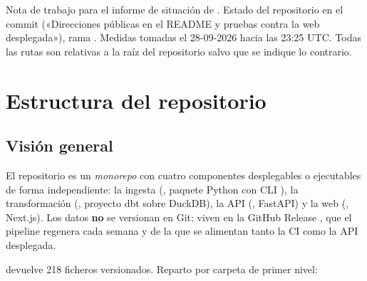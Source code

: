 \begin{nota}
Nota de trabajo para el informe de situación de . Estado del repositorio en el commit  («Direcciones públicas en el README y pruebas contra la web desplegada»), rama . Medidas tomadas el 28-09-2026 hacia las 23:25 UTC. Todas las rutas son relativas a la raíz del repositorio salvo que se indique lo contrario.
\end{nota}

\section{Estructura del repositorio}

\subsection{Visión general}

El repositorio es un \emph{monorepo} con cuatro componentes desplegables o ejecutables de forma independiente: la ingesta (, paquete Python con CLI ), la transformación (, proyecto dbt sobre DuckDB), la API (, FastAPI) y la web (, Next.js). Los datos \textbf{no} se versionan en Git: viven en la GitHub Release , que el pipeline regenera cada semana y de la que se alimentan tanto la CI como la API desplegada.

 devuelve 218 ficheros versionados. Reparto por carpeta de primer nivel:


